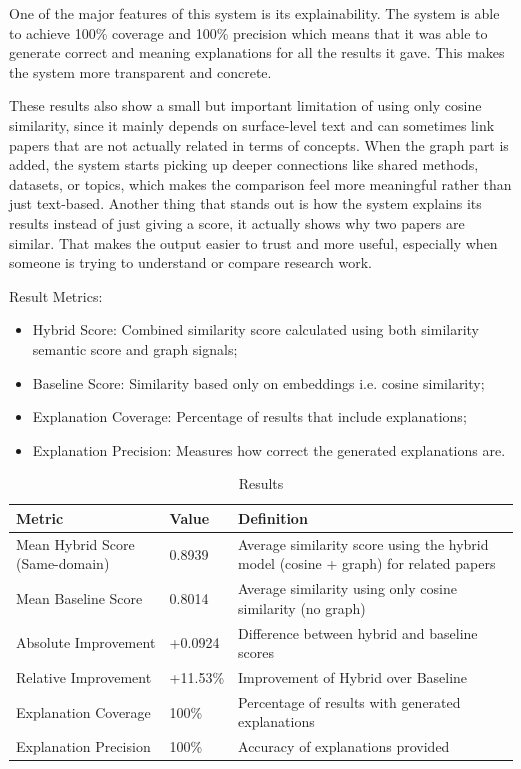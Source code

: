 \documentclass[10pt]{article}
\begin{document}
One of the major features of this system is its explainability. The system is able to achieve 100\% coverage and 100\% precision which means that it was able to generate correct and meaning explanations for all the results it gave. This makes the system more transparent and concrete.

These results also show a small but important limitation of using only cosine similarity, since it mainly depends on surface-level text and can sometimes link papers that are not actually related in terms of concepts. When the graph part is added, the system starts picking up deeper connections like shared methods, datasets, or topics, which makes the comparison feel more meaningful rather than just text-based. Another thing that stands out is how the system explains its results instead of just giving a score, it actually shows why two papers are similar. That makes the output easier to trust and more useful, especially when someone is trying to understand or compare research work.

Result Metrics:
\begin{itemize}[leftmargin=*,noitemsep]
\item Hybrid Score: Combined similarity score calculated using both similarity semantic score and graph signals;
\item Baseline Score: Similarity based only on embeddings i.e. cosine similarity;
\item Explanation Coverage: Percentage of results that include explanations;
\item Explanation Precision: Measures how correct the generated explanations are.
\end{itemize}

\begin{table}[htbp]
\centering
\caption{Results}
\label{tab:results}
\begin{tabularx}{\linewidth}{P{3.3cm} P{2.2cm} Y}
\toprule
\textbf{Metric} & \textbf{Value} & \textbf{Definition}\\
\midrule
Mean Hybrid Score (Same-domain) & 0.8939 & Average similarity score using the hybrid model (cosine + graph) for related papers\\
Mean Baseline Score & 0.8014 & Average similarity using only cosine similarity (no graph)\\
Absolute Improvement & +0.0924 & Difference between hybrid and baseline scores\\
Relative Improvement & +11.53\% & Improvement of Hybrid over Baseline\\
Explanation Coverage & 100\% & Percentage of results with generated explanations\\
Explanation Precision & 100\% & Accuracy of explanations provided\\
\bottomrule
\end{tabularx}
\end{table}
\end{document}
